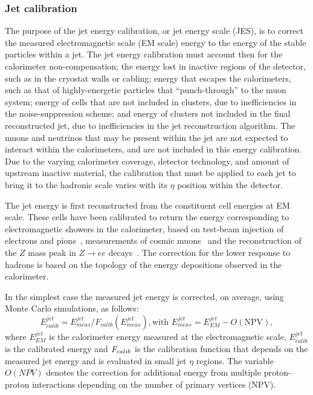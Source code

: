 \subsubsection{Jet calibration}

The purpose of the jet energy calibration, or jet energy scale (JES), is to correct the measured electromagnetic scale (EM scale) energy to the energy of the stable particles within a jet.  The jet energy calibration must account then for the calorimeter non-compensation; the energy lost in inactive regions of the detector, such as in the cryostat walls or cabling; energy that escapes the calorimeters, such as that of highly-energetic particles that “punch-through” to the muon system; energy of cells that are not included in clusters, due to inefficiencies in the noise-suppression scheme; and energy of clusters not included in the final reconstructed jet, due to inefficiencies in the jet reconstruction algorithm. The muons and neutrinos that may be present within the jet are not expected to interact within the calorimeters, and are not included in this energy calibration.
Due to the varying calorimeter coverage, detector technology, and amount of upstream inactive material, the calibration that must be applied to each jet to bring it to the hadronic scale varies with its $\eta$ position within the detector. 

The jet energy is first reconstructed from the constituent cell energies at EM scale. These cells have been calibrated to return the energy corresponding to electromagnetic showers in the calorimeter, based on test-beam injection of electrons and pions~\cite{Aharrouche2006601},  measurements of cosmic muons~\cite{Cooke:1071187} and the reconstruction of the $Z$ mass peak in $Z \rightarrow ee$ decays~\cite{Aad:2011mk}. The correction for the lower response to hadrons is based on the topology of the energy depositions observed in the calorimeter. 

In the simplest case the measured jet energy is corrected, on average, using Monte Carlo simulations, as follows:
%
\begin{equation}
E^{jet}_{calib} = E^{jet}_{meas} /F_{calib}(E^{jet}_{meas}),   \mbox{with  }   E^{jet}_{meas} = E^{jet}_{EM} - O(\mbox{NPV}),
\end{equation}
%
where $E^{jet}_{EM}$ is the calorimeter energy measured at the electromagnetic scale, $E^{jet}_{calib}$ is the calibrated energy and $\emph{F}_{calib}$ is the calibration function that depends on the measured jet energy and is evaluated in small jet $\eta$ regions. The variable $ O(NPV)$ denotes the correction for additional energy from multiple proton-proton interactions depending on the number of primary vertices (NPV).

